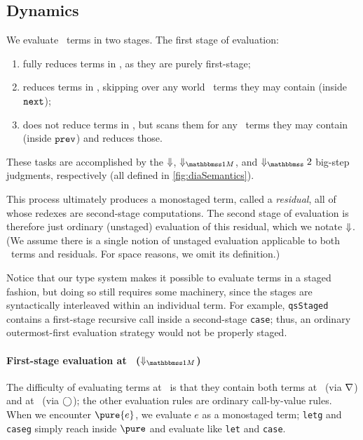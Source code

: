 \subsection{Dynamics}
\label{sec:stagedsemantics}



\begin{abstrsyn}

We evaluate \lang\ terms in two stages. The first stage of evaluation:
\begin{enumerate}
\item fully reduces terms in \bbonep, as they are purely first-stage;
\item reduces terms in \bbonem, skipping over any world \bbtwo\ terms they may
contain (inside ${\tt next}$);
\item does not reduce terms in \bbtwo, but scans them for any \bbonem\ terms
they may contain (inside ${\tt prev}$) and reduces those.
\end{enumerate}
These tasks are accomplished by the ${\Downarrow}$, $\redonesym$, and $\redtwosym$
big-step judgments, respectively (all defined in \ref{fig:diaSemantics}).

This process ultimately produces a monostaged term, called a \emph{residual},
all of whose redexes are second-stage computations. The second stage of
evaluation is therefore just ordinary (unstaged) evaluation of this residual,
which we notate ${\Downarrow}$. (We assume there is a single notion of unstaged
evaluation applicable to both \bbonep\ terms and residuals. For space reasons,
we omit its definition.)

Notice that our type system makes it possible to evaluate terms in a staged
fashion, but doing so still requires some machinery, since the stages are
syntactically interleaved within an individual term. For example,
\texttt{qsStaged} contains a first-stage recursive call inside a second-stage
\texttt{case}; thus, an ordinary outermost-first evaluation strategy would not
be properly staged.

\paragraph{First-stage evaluation at \bbonem\ ($\redonesym$)}
The difficulty of evaluating terms at \bbonem\ is that they contain both terms
at \bbonep\ (via $\nabla$) and at \bbtwo\ (via $\bigcirc$); the other evaluation
rules are ordinary call-by-value rules. When we encounter $\pure{e}$, we
evaluate $e$ as a monostaged term; \texttt{letg} and \texttt{caseg} simply reach
inside $\pure$ and evaluate like \texttt{let} and \texttt{case}.


\end{abstrsyn}
